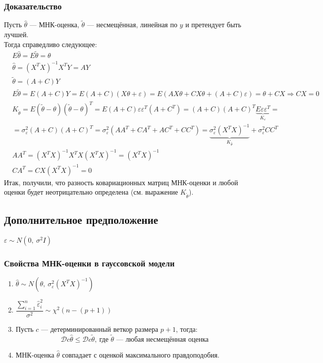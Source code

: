 \documentclass[12pt, a4paper]{article}
\newcommand{\dev}{\mathcal{D}}
\begin{document}
\subsubsection*{Доказательство}
Пусть $\hat \theta$ --- МНК-оценка, $\tilde \theta$ --- несмещённая, линейная по $y$ и претендует быть лучшей.\\
Тогда справедливо следующее:
\[
\begin{aligned}
    & E\hat \theta = E\tilde \theta = \theta\\
    & \hat \theta  = (X^T X)^{-1} X^T Y = AY\\
    & \tilde \theta = (A + C)Y\\
    & E\tilde \theta = E(A + C)Y = E(A + C)(X\theta + \varepsilon) = E(AX\theta + CX \theta + (A + C)\varepsilon) = \theta + CX \Rightarrow CX = 0\\
    & K_{\tilde \theta} = E(\tilde \theta - \theta) \left( \tilde \theta - \theta \right)^T = E(A + C)\varepsilon \varepsilon^T \left( A + C^T \right) = \left( A + C \right)\left( A + C \right)^T \underset{K_{\varepsilon}}{\underbrace{E \varepsilon \varepsilon^T}} =\\
    & =\sigma^2_{\varepsilon} \left( A + C \right) \left( A + C \right)^T = \sigma_{\varepsilon}^2 \left(AA^T + CA^T + AC^T + CC^T \right) = \underset{K_{\hat \theta}}{\underbrace{\sigma_{\varepsilon}^2 \left( X^T X \right)^{-1}}} + \sigma^2_{\varepsilon} CC^T\\
    & AA^T = \left( X^T X \right)^{-1} X^T X \left( X^T X \right)^{-1} = \left( X^T X \right)^{-1}\\
    & CA^T = CX \left( X^T X \right)^{-1} = 0
\end{aligned}
\]
Итак, получили, что разность ковариационных матриц МНК-оценки и любой оценки будет неотрицательно определена (см. выражение $K_{\tilde \theta}$).
\subsection*{Дополнительное предположение}
$\varepsilon \sim N(0,\ \sigma^2 I)$
\subsubsection*{Свойства МНК-оценки в гауссовской модели}
\begin{enumerate}
    \item $\hat \theta \sim N\left(\theta,\ \sigma^2_{\varepsilon} \left( X^T X \right)^{-1}\right)$
    \item $\dfrac{\sum_{i = 1}^{n} \hat \varepsilon^2_i}{\sigma^2} \sim \chi^2 \left( n - (p + 1) \right)$
    \item Пусть $c$ --- детерминированный веткор размера $p + 1$, тогда:
    \[
    \dev c\hat\theta \leq \dev c\tilde \theta,\ \text{где $\tilde \theta$ --- любая несмещённая оценка}
    \]
    \item МНК-оценка $\hat \theta$ совпадает с оценкой максимального правдоподобия. 
\end{enumerate}
\end{document}
